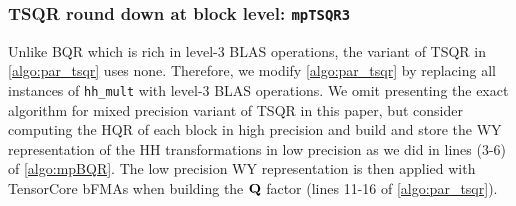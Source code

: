 \subsubsection{TSQR round down at block level: {\tt mpTSQR3}}\label{sec:mp-3t}
%
Unlike BQR which is rich in level-3 BLAS operations, the variant of TSQR in \cref{algo:par_tsqr} uses none.
Therefore, we modify \cref{algo:par_tsqr} by replacing all instances of {\tt hh\_mult} with level-3 BLAS operations.
We omit presenting the exact algorithm for mixed precision variant of TSQR in this paper, but consider computing the HQR of each block in high precision and build and store the WY representation of the HH transformations in low precision as we did in lines (3-6) of \cref{algo:mpBQR}.
The low precision WY representation is then applied with TensorCore bFMAs when building the $\mathbf{Q}$ factor (lines 11-16 of \cref{algo:par_tsqr}). 

